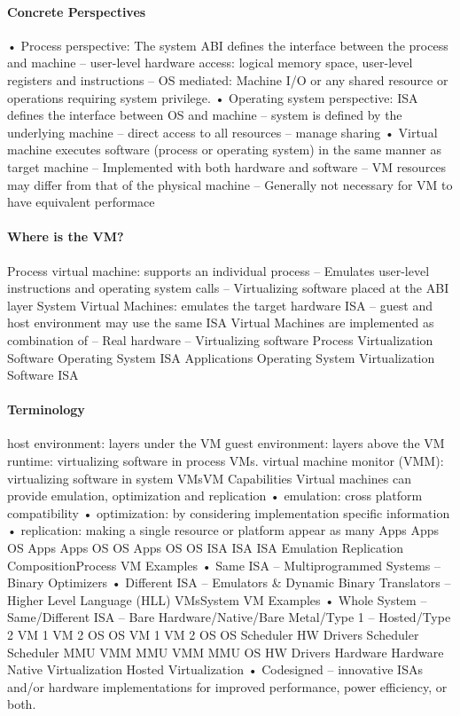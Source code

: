 \documentclass[10pt]{article}
\begin{document}
\paragraph{Concrete Perspectives}
•  Process perspective: The system ABI defines the interface
between the process and machine
–  user-level hardware access: logical memory space, user-level
registers and instructions
–  OS mediated: Machine I/O or any shared resource or operations
requiring system privilege.
•  Operating system perspective: ISA defines the interface between
OS and machine
–  system is defined by the underlying machine
–  direct access to all resources
–  manage sharing
•  Virtual machine executes software (process or operating system)
in the same manner as target machine
–  Implemented with both hardware and software
–  VM resources may differ from that of the physical machine
–  Generally not necessary for VM to have equivalent performace

\paragraph{Where is the VM?}
Process virtual machine: supports an individual process
–  Emulates user-level instructions and operating system calls
–  Virtualizing software placed at the ABI layer
System Virtual Machines: emulates the target hardware ISA
–  guest and host environment may use the same ISA
Virtual Machines are implemented as combination of
–  Real hardware
–  Virtualizing software
Process
Virtualization Software
Operating System
ISA
Applications
Operating System
Virtualization Software
ISA


\paragraph{Terminology}

host environment: layers under the VM
guest environment: layers above the VM
runtime: virtualizing software in process VMs.
virtual machine monitor (VMM): virtualizing software
in system VMsVM Capabilities
Virtual machines can provide emulation, optimization
and replication
•  emulation: cross platform compatibility
•  optimization: by considering implementation specific
information
•  replication: making a single resource or platform appear as
many
Apps
Apps
OS
Apps
Apps
OS
OS
Apps
OS
OS
ISA ISA ISA
Emulation Replication CompositionProcess VM Examples
•  Same ISA
–  Multiprogrammed Systems
–  Binary Optimizers
•  Different ISA
–  Emulators \& Dynamic Binary Translators
–  Higher Level Language (HLL) VMsSystem VM Examples
•  Whole System
–  Same/Different ISA
–  Bare Hardware/Native/Bare Metal/Type 1
–  Hosted/Type 2
VM 1 VM 2
OS OS
VM 1 VM 2 OS OS Scheduler
HW
Drivers Scheduler
Scheduler
MMU
VMM
MMU
VMM MMU
OS HW
Drivers
Hardware Hardware
Native Virtualization Hosted Virtualization
•  Codesigned
–  innovative ISAs and/or hardware implementations for
improved performance, power efficiency, or both.
\end{document}
